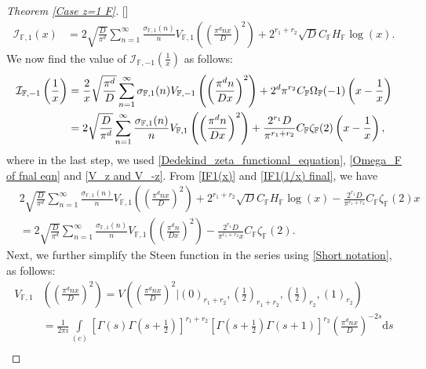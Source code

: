 \documentclass[12pt,reqno]{amsart}
\renewcommand{\(}{\left\(}
\renewcommand{\)}{\right\)}
\renewcommand{\[}{\left\[}
\renewcommand{\]}{\right\]}
\numberwithin{equation}{section}
\theoremstyle{plain}
\begin{document}
\begin{proof}[Theorem \rm{\ref{Case z=1 F}}][]
\begin{align}
\mathcal{I}_{\mathbb{F}, 1}(x) &= 2\sqrt{\frac{D}{\pi^d}}\sum_{n=1}^{\infty}\frac{\sigma_{\mathbb{F}, 1}(n)}{n}V_{\mathbb{F}, 1}\left(\left(\frac{\pi^{d} n x}{D}\right)^2\right) + 2^{r_1+r_2}\sqrt{D}C_{\mathbb{F}}H_{\mathbb{F}}\log(x). \label{IF1(x)}
\end{align}
We now find the value of $\mathcal{I}_{\mathbb{F}, -1}\left(\frac{1}{x}\right)$ as follows:
\begin{align}
\mathcal{I}_{\mathbb{F}, -1}\left(\frac{1}{x}\right) &= \frac{2}{x}\sqrt{\frac{\pi^d}{D}}\sum_{n=1}^{\infty}\sigma_{\mathbb{F}, 1}(n)V_{\mathbb{F}, -1}\left(\left(\frac{\pi^{d} n}{Dx}\right)^2\right) + 2^d\pi^{r_2}C_{\mathbb{F}}\Omega_{\mathbb{F}}(-1)\left(x - \frac{1}{x}\right) \notag \\
&= 2\sqrt{\frac{D}{\pi^d}}\sum_{n=1}^{\infty}\frac{\sigma_{\mathbb{F}, 1}(n)}{n}V_{\mathbb{F}, 1}\left(\left(\frac{\pi^{d} n}{Dx}\right)^2 \right) + \frac{2^{r_1}D}{\pi^{r_1+r_2}}C_{\mathbb{F}}\zeta_{\mathbb{F}}(2)\left(x - \frac{1}{x}\right), \label{IF1(1/x) final}
\end{align}
where in the last step, we used \eqref{Dedekind_zeta_functional_equation}, \eqref{Omega_F of fnal eqn} and \eqref{V_z and V_-z}.
From \eqref{IF1(x)} and \eqref{IF1(1/x) final}, we have
\begin{align}
&2\sqrt{\frac{D}{\pi^d}}\sum_{n=1}^{\infty}\frac{\sigma_{\mathbb{F}, 1}(n)}{n}V_{\mathbb{F}, 1}\left(\left(\frac{\pi^{d} n x}{D}\right)^2\right) + 2^{r_1+r_2}\sqrt{D}C_{\mathbb{F}}H_{\mathbb{F}}\log(x) - \frac{2^{r_1}D}{\pi^{r_1+r_2}}C_{\mathbb{F}}\zeta_{\mathbb{F}}(2)x \nonumber \\
&= 2\sqrt{\frac{D}{\pi^d}}\sum_{n=1}^{\infty}\frac{\sigma_{\mathbb{F}, 1}(n)}{n}V_{\mathbb{F}, 1}\left(\left(\frac{\pi^{d} n}{Dx}\right)^2 \right) - \frac{2^{r_1}D}{\pi^{r_1+r_2}x}C_{\mathbb{F}}\zeta_{\mathbb{F}}(2). \label{Before solving Steen}
\end{align}
Next, we further simplify the Steen function in the series using \eqref{Short notation}, as follows:
\begin{align}
V_{\mathbb{F}, 1}&\left(\left(\frac{\pi^{d} n x}{D}\right)^2\right) = V\left(\left(\frac{\pi^{d} n x}{D}\right)^2\bigg|\left(0\right)_{r_1 + r_2}, \left(\frac{1}{2}\right)_{r_1 + r_2}, \left(\frac{1}{2}\right)_{r_2}, (1)_{r_2}\right) \nonumber \\
&= \frac{1}{2\pi i}\int\limits_{(c)}\left[\Gamma(s)\Gamma\left(s+\frac{1}{2}\right)\right]^{r_1+r_2}\!\left[\Gamma\left(s+\frac{1}{2}\right)\Gamma\left(s+1\right)\right]^{r_2}\!\left(\frac{\pi^{d} n x}{D}\right)^{-2s} \textrm{d}s \nonumber \\

\end{align}
\end{proof}
\end{document}
